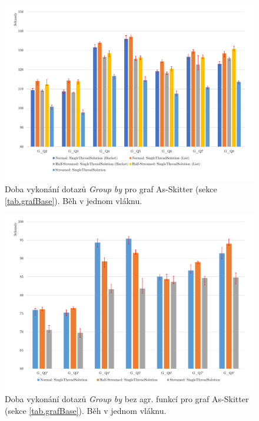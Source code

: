 \begin{figure}[!htp]
\includegraphics[width=\linewidth]{../img/skitterGroupByST.pdf}\centering
\caption{Doba vykonání dotazů \textit{Group by} pro graf As-Skitter (sekce \ref{tab.grafBase}). Běh v jednom vláknu.}
\label{figure.skitterGroupByST}
\end{figure}
\begin{figure}[!htp]
\includegraphics[width=\linewidth]{../img/skitterGroupBySTNoAgg.pdf}\centering
\caption{Doba vykonání dotazů \textit{Group by} bez agr. funkcí pro graf As-Skitter (sekce \ref{tab.grafBase}). Běh v jednom vláknu.}
\label{figure.skitterGroupBySTNoAgg}
\end{figure}



\clearpage

